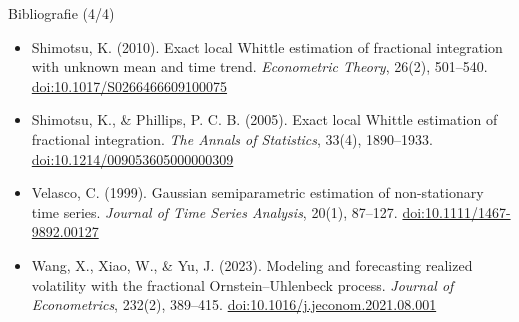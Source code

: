 \begin{frame}{Bibliografie (4/4)}
\begin{itemize}
    \item Shimotsu, K. (2010). Exact local Whittle estimation of fractional integration with unknown mean and time trend. \textit{Econometric Theory}, 26(2), 501--540. \href{https://doi.org/10.1017/S0266466609100075}{doi:10.1017/S0266466609100075}
    \item Shimotsu, K., \& Phillips, P. C. B. (2005). Exact local Whittle estimation of fractional integration. \textit{The Annals of Statistics}, 33(4), 1890--1933. \href{https://doi.org/10.1214/009053605000000309}{doi:10.1214/009053605000000309}
    \item Velasco, C. (1999). Gaussian semiparametric estimation of non-stationary time series. \textit{Journal of Time Series Analysis}, 20(1), 87--127. \href{https://doi.org/10.1111/1467-9892.00127}{doi:10.1111/1467-9892.00127}
    \item Wang, X., Xiao, W., \& Yu, J. (2023). Modeling and forecasting realized volatility with the fractional Ornstein--Uhlenbeck process. \textit{Journal of Econometrics}, 232(2), 389--415. \href{https://doi.org/10.1016/j.jeconom.2021.08.001}{doi:10.1016/j.jeconom.2021.08.001}
\end{itemize}
\end{frame}


